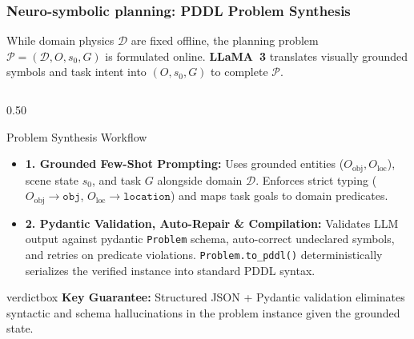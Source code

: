 \documentclass[10pt]{beamer}
\begin{document}
\begin{frame}[t]
\frametitle{Neuro-symbolic planning: PDDL Problem Synthesis}
\footnotesize
While domain physics $\mathcal{D}$ are fixed offline, the planning problem $\mathcal{P} = (\mathcal{D}, O, s_0, G)$ is formulated online. \textbf{LLaMA~3} translates visually grounded symbols and task intent into $(O, s_0, G)$ to complete $\mathcal{P}$.

\vspace{0.05cm}
\begin{columns}[T]
    \begin{column}{0.50\textwidth}
        \begin{block}{Problem Synthesis Workflow}
            \begin{itemize}\scriptsize
                \setlength\itemsep{0.45em}
                \item \textbf{1. Grounded Few-Shot Prompting:} Uses grounded entities ($O_{\text{obj}}, O_{\text{loc}}$), scene state $s_0$, and task $G$ alongside domain $\mathcal{D}$. Enforces strict typing ($O_{\text{obj}} \to \texttt{obj}$, $O_{\text{loc}} \to \texttt{location}$) and maps task goals to domain predicates.
                \item \textbf{2. Pydantic Validation, Auto-Repair \& Compilation:} Validates LLM output against pydantic \texttt{Problem} schema, auto-correct undeclared symbols, and retries on predicate violations. \texttt{Problem.to\_pddl()} deterministically serializes the verified instance into standard PDDL syntax.
            \end{itemize}
        \end{block}

        \vspace{0.05cm}
        \begin{beamercolorbox}[sep=3pt,center,shadow=true,rounded=true]{verdictbox}
            \tiny \textbf{Key Guarantee:} Structured JSON + Pydantic validation eliminates syntactic and schema hallucinations in the problem instance given the grounded state.
        \end{beamercolorbox}
    \end{column}


\end{columns}
\end{frame}
\end{document}
